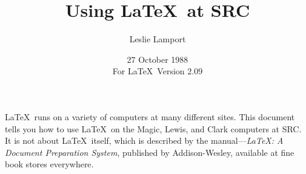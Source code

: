 %
%
%
 
 
 
\newcommand{\contact}{Leslie Lamport}
 
\newcommand{\BibTeX}{{\rm B\kern-.05em{\sc i\kern-.025em b}\kern-.08em
    T\kern-.1667em\lower.7ex\hbox{E}\kern-.125emX}}
 
 
\newcommand\bs{\char '134 }   %
\newcommand{\lb}{\char '173 } %
\newcommand{\rb}{\char '175 } %
 
\title{Using \LaTeX\ at SRC}
 
\author{Leslie Lamport}
 
\date{27 October 1988\\              %
For \LaTeX\ Version 2.09} 
 

 
\maketitle
 
\tableofcontents
 
\newpage
 
\LaTeX\ runs on a variety of computers at many different sites.  This
document tells you how to use \LaTeX\ on the Magic, Lewis, and Clark
computers at SRC. It is not about \LaTeX\ itself, which is described by
the manual---{\em \LaTeX: A Document Preparation System}, published by
Addison-Wesley, available at fine book stores everywhere.
 

